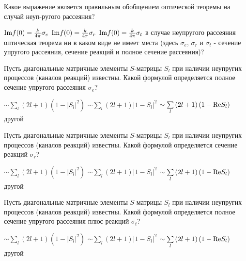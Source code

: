 \documentclass[11pt,a4paper]{exam}
\begin{document}
\begin{questions}
\question Какое выражение является правильным обобщением оптической теоремы на случай неуп-ругого рассеяния?
\begin{choices}
\choice ${\mathop{\rm Im}\nolimits} f(0) = \frac{k}{{4\pi }}{\sigma _e}$     
\choice ${\mathop{\rm Im}\nolimits} f(0) = \frac{k}{{4\pi }}{\sigma _r}$     
\choice ${\mathop{\rm Im}\nolimits} f(0) = \frac{k}{{4\pi }}{\sigma _t}$
\choice в случае неупругого рассеяния оптическая теорема ни в каком виде не имеет места
(здесь ${\sigma _e}$, ${\sigma _r}$ и ${\sigma _t}$ - сечение упругого рассеяния, сечение реакций и полное сечение рассеяния)?
\end{choices}

\question Пусть диагональные матричные элементы $S$-матрицы ${S_l}$ при наличии неупругих процессов (каналов реакций) известны. Какой формулой определяется полное сечение упругого рассеяния ${\sigma _e}$?
\begin{choices}
\choice $ \sim \sum\limits_l {(2l + 1)\left( {1 - {{\left| {{S_l}} \right|}^2}} \right)} $  
\choice $ \sim \sum\limits_l {(2l + 1){{\left| {1 - {S_l}} \right|}^2}} $    
\choice $ \sim \sum\limits_l {(2l + 1)\left( {1 - {\mathop{\rm Re}\nolimits} {S_l}} \right)} $ 
\choice другой
\end{choices}

\question Пусть диагональные матричные элементы $S$-матрицы ${S_l}$ при наличии неупругих процессов (каналов реакций) известны. Какой формулой определяется сечение реакций ${\sigma _r}$?
\begin{choices}
\choice $ \sim \sum\limits_l {(2l + 1)\left( {1 - {{\left| {{S_l}} \right|}^2}} \right)} $  
\choice $ \sim \sum\limits_l {(2l + 1){{\left| {1 - {S_l}} \right|}^2}} $    
\choice $ \sim \sum\limits_l {(2l + 1)\left( {1 - {\mathop{\rm Re}\nolimits} {S_l}} \right)} $ 
\choice другой
\end{choices}

\question Пусть диагональные матричные элементы $S$-матрицы ${S_l}$ при наличии неупругих процессов (каналов реакций) известны. Какой формулой определяется полное сечение упругого рассеяния плюс реакций ${\sigma _t}$?
\begin{choices}
\choice $ \sim \sum\limits_l {(2l + 1)\left( {1 - {{\left| {{S_l}} \right|}^2}} \right)} $  
\choice $ \sim \sum\limits_l {(2l + 1){{\left| {1 - {S_l}} \right|}^2}} $    
\choice $ \sim \sum\limits_l {(2l + 1)\left( {1 - {\mathop{\rm Re}\nolimits} {S_l}} \right)} $ 
\choice другой
\end{choices}


\end{questions}
\end{document}
